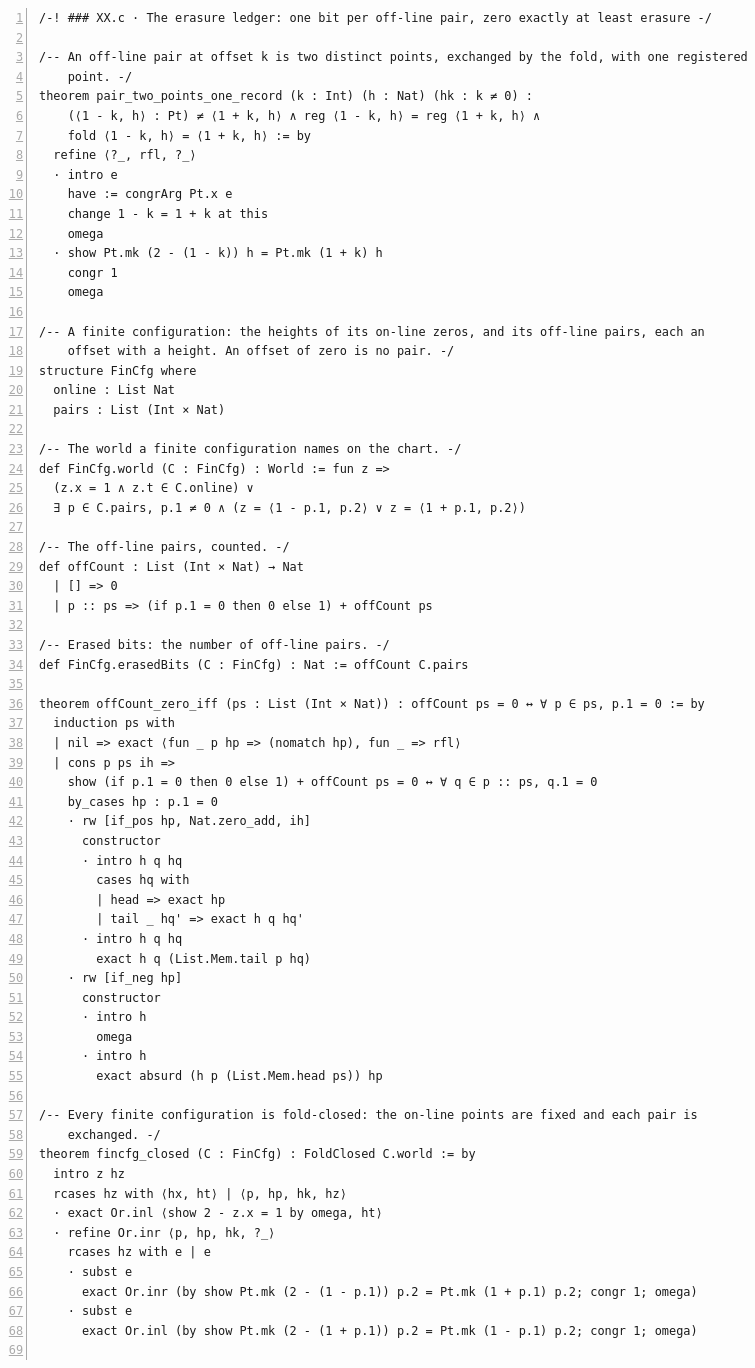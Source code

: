 \documentclass[10pt]{article}
\newcommand{\leansize}{\fontsize{5.5pt}{6.75pt}\selectfont}
\begin{document}
\begin{multicols}{2}
\begin{Verbatim}[numbers=left,firstnumber=1,numbersep=3pt,xleftmargin=2.6em,breaklines=true,breakanywhere=true,breakautoindent=false,breakindent=1.4em,breaksymbolleft={},breakanywheresymbolpre={},fontsize=\leansize]
/-! ### XX.c · The erasure ledger: one bit per off-line pair, zero exactly at least erasure -/

/-- An off-line pair at offset k is two distinct points, exchanged by the fold, with one registered
    point. -/
theorem pair_two_points_one_record (k : Int) (h : Nat) (hk : k ≠ 0) :
    (⟨1 - k, h⟩ : Pt) ≠ ⟨1 + k, h⟩ ∧ reg ⟨1 - k, h⟩ = reg ⟨1 + k, h⟩ ∧
    fold ⟨1 - k, h⟩ = ⟨1 + k, h⟩ := by
  refine ⟨?_, rfl, ?_⟩
  · intro e
    have := congrArg Pt.x e
    change 1 - k = 1 + k at this
    omega
  · show Pt.mk (2 - (1 - k)) h = Pt.mk (1 + k) h
    congr 1
    omega

/-- A finite configuration: the heights of its on-line zeros, and its off-line pairs, each an
    offset with a height. An offset of zero is no pair. -/
structure FinCfg where
  online : List Nat
  pairs : List (Int × Nat)

/-- The world a finite configuration names on the chart. -/
def FinCfg.world (C : FinCfg) : World := fun z =>
  (z.x = 1 ∧ z.t ∈ C.online) ∨
  ∃ p ∈ C.pairs, p.1 ≠ 0 ∧ (z = ⟨1 - p.1, p.2⟩ ∨ z = ⟨1 + p.1, p.2⟩)

/-- The off-line pairs, counted. -/
def offCount : List (Int × Nat) → Nat
  | [] => 0
  | p :: ps => (if p.1 = 0 then 0 else 1) + offCount ps

/-- Erased bits: the number of off-line pairs. -/
def FinCfg.erasedBits (C : FinCfg) : Nat := offCount C.pairs

theorem offCount_zero_iff (ps : List (Int × Nat)) : offCount ps = 0 ↔ ∀ p ∈ ps, p.1 = 0 := by
  induction ps with
  | nil => exact ⟨fun _ p hp => (nomatch hp), fun _ => rfl⟩
  | cons p ps ih =>
    show (if p.1 = 0 then 0 else 1) + offCount ps = 0 ↔ ∀ q ∈ p :: ps, q.1 = 0
    by_cases hp : p.1 = 0
    · rw [if_pos hp, Nat.zero_add, ih]
      constructor
      · intro h q hq
        cases hq with
        | head => exact hp
        | tail _ hq' => exact h q hq'
      · intro h q hq
        exact h q (List.Mem.tail p hq)
    · rw [if_neg hp]
      constructor
      · intro h
        omega
      · intro h
        exact absurd (h p (List.Mem.head ps)) hp

/-- Every finite configuration is fold-closed: the on-line points are fixed and each pair is
    exchanged. -/
theorem fincfg_closed (C : FinCfg) : FoldClosed C.world := by
  intro z hz
  rcases hz with ⟨hx, ht⟩ | ⟨p, hp, hk, hz⟩
  · exact Or.inl ⟨show 2 - z.x = 1 by omega, ht⟩
  · refine Or.inr ⟨p, hp, hk, ?_⟩
    rcases hz with e | e
    · subst e
      exact Or.inr (by show Pt.mk (2 - (1 - p.1)) p.2 = Pt.mk (1 + p.1) p.2; congr 1; omega)
    · subst e
      exact Or.inl (by show Pt.mk (2 - (1 + p.1)) p.2 = Pt.mk (1 - p.1) p.2; congr 1; omega)


\end{Verbatim}
\end{multicols}
\end{document}
